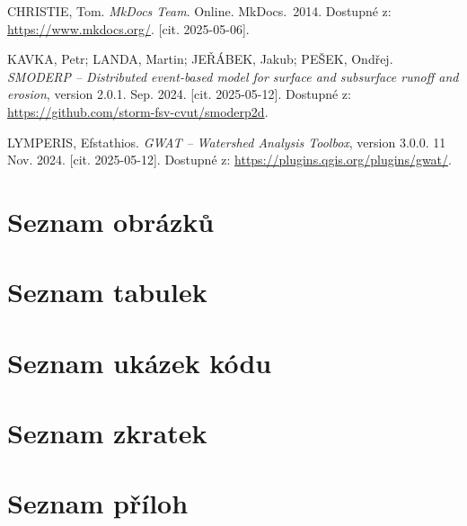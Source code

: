 \documentclass[a4paper,oneside,12pt]{book}
\begin{document}
\begin{thebibliography}{1}
CHRISTIE, Tom. \textit{MkDocs Team}. Online. MkDocs.~2014. Dostupné z: \url{https://www.mkdocs.org/}. [cit. 2025-05-06].

KAVKA, Petr; LANDA, Martin; JEŘÁBEK, Jakub; PEŠEK, Ondřej. \textit{SMODERP – Distributed event-based model for surface and subsurface runoff and erosion}, version 2.0.1. Sep. 2024. [cit. 2025-05-12]. Dostupné z: \url{https://github.com/storm-fsv-cvut/smoderp2d}.

LYMPERIS, Efstathios. \textit{GWAT – Watershed Analysis Toolbox}, version 3.0.0. 11 Nov. 2024. [cit. 2025-05-12]. Dostupné z: \url{https://plugins.qgis.org/plugins/gwat/}.


\end{thebibliography}

\chapter*{Seznam obrázků} \label{list_pics}
\chapter*{Seznam tabulek} \label{list_tables}
\chapter*{Seznam ukázek kódu} \label{list_code}
\chapter*{Seznam zkratek} \label{list_abr}
\chapter*{Seznam příloh} \label{list_attach}
\end{document}
